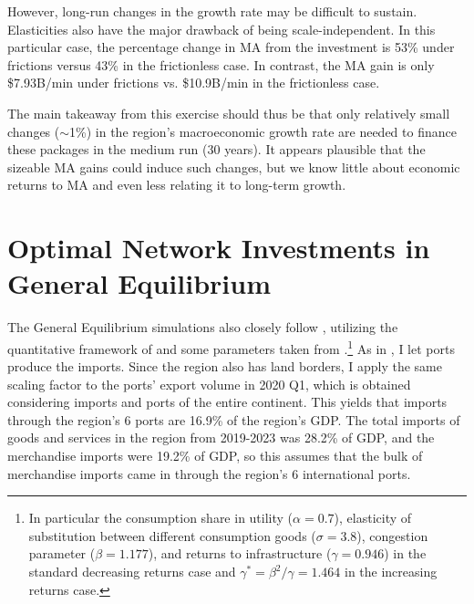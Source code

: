 \documentclass[a4paper]{article}
\begin{document}
However, long-run changes in the growth rate may be difficult to sustain. Elasticities also have the major drawback of being scale-independent. In this particular case, the percentage change in MA from the investment is 53\% under frictions versus 43\% in the frictionless case. In contrast, the MA gain is only \$7.93B/min under frictions vs. \$10.9B/min in the frictionless case. \newline 

The main takeaway from this exercise should thus be that only relatively small changes ($\sim$1\%) in the region's macroeconomic growth rate are needed to finance these packages in the medium run (30 years). It appears plausible that the sizeable MA gains could induce such changes, but we know little about economic returns to MA and even less relating it to long-term growth.  




\newpage


\section{Optimal Network Investments in General Equilibrium}

The General Equilibrium simulations also closely follow \citet{krantz2024optimal}, utilizing the quantitative framework of \citet{fajgelbaum2020optimal} and some parameters taken from \citet{graff2024spatial}.\footnote{In particular the consumption share in utility ($\alpha = 0.7$), elasticity of substitution between different consumption goods ($\sigma = 3.8$), congestion parameter ($\beta = 1.177$), and returns to infrastructure ($\gamma = 0.946$) in the standard decreasing returns case and $\gamma^* = \beta^2/\gamma = 1.464$ in the increasing returns case.} As in \citet{krantz2024optimal}, I let ports produce the imports. Since the region also has land borders, I apply the same scaling factor to the ports' export volume in 2020 Q1, which is obtained considering imports and ports of the entire continent. This yields that imports through the region's 6 ports are 16.9\% of the region's GDP. The total imports of goods and services in the region from 2019-2023 was 28.2\% of GDP, and the merchandise imports were 19.2\% of GDP, so this assumes that the bulk of merchandise imports came in through the region's 6 international ports.  
\end{document}
